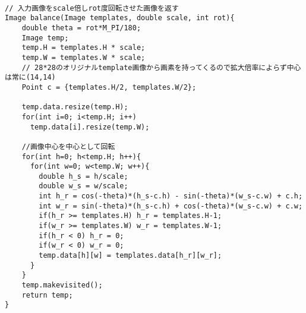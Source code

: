    
\begin{lstlisting}[basicstyle=\ttfamily\footnotesize, frame=single]

// 入力画像をscale倍しrot度回転させた画像を返す
Image balance(Image templates, double scale, int rot){
    double theta = rot*M_PI/180;
    Image temp;
    temp.H = templates.H * scale;
    temp.W = templates.W * scale;
    // 28*28のオリジナルtemplate画像から画素を持ってくるので拡大倍率によらず中心は常に(14,14)
    Point c = {templates.H/2, templates.W/2};

    temp.data.resize(temp.H);
    for(int i=0; i<temp.H; i++)
      temp.data[i].resize(temp.W);

    //画像中心を中心として回転
    for(int h=0; h<temp.H; h++){
      for(int w=0; w<temp.W; w++){
        double h_s = h/scale;
        double w_s = w/scale;
        int h_r = cos(-theta)*(h_s-c.h) - sin(-theta)*(w_s-c.w) + c.h;
        int w_r = sin(-theta)*(h_s-c.h) + cos(-theta)*(w_s-c.w) + c.w;
        if(h_r >= templates.H) h_r = templates.H-1;
        if(w_r >= templates.W) w_r = templates.W-1;
        if(h_r < 0) h_r = 0;
        if(w_r < 0) w_r = 0;
        temp.data[h][w] = templates.data[h_r][w_r];
      }
    }
    temp.makevisited();
    return temp;
}

\end{lstlisting}

